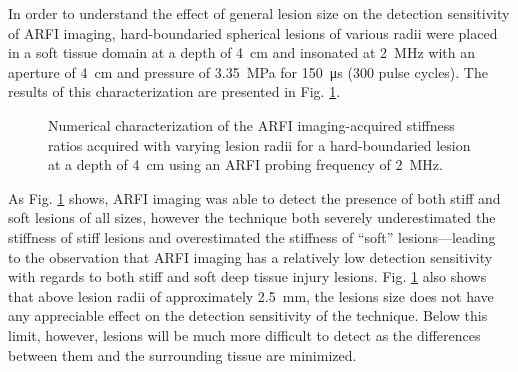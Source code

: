 			In order to understand the effect of general lesion size on the detection sensitivity of ARFI imaging, hard-boundaried spherical lesions of various radii were placed in a soft tissue domain at a depth of \SI{4}{\cm} and insonated at \SI{2}{\MHz} with an aperture of \SI{4}{\cm} and pressure of \SI{3.35}{\MPa} for \SI{150}{\us} (300 pulse cycles). The results of this characterization are presented in Fig. \ref{fig:arfi_radius}.

			\begin{figure}[!htb]
				\centering
				\caption[Numerical characterization of ARFI imaging-acquired stiffness ratio with changing lesion radius]{Numerical characterization of the ARFI imaging-acquired stiffness ratios acquired with varying lesion radii for a hard-boundaried lesion at a depth of \SI{4}{\cm} using an ARFI probing frequency of \SI{2}{\MHz}.}
				\label{fig:arfi_radius}
			\end{figure}

			As Fig. \ref{fig:arfi_radius} shows, ARFI imaging was able to detect the presence of both stiff and soft lesions of all sizes, however the technique both severely underestimated the stiffness of stiff lesions and overestimated the stiffness of ``soft'' lesions---leading to the observation that ARFI imaging has a relatively low detection sensitivity with regards to both stiff and soft deep tissue injury lesions. Fig. \ref{fig:arfi_radius} also shows that above lesion radii of approximately \SI{2.5}{\mm}, the lesions size does not have any appreciable effect on the detection sensitivity of the technique. Below this limit, however, lesions will be much more difficult to detect as the differences between them and the surrounding tissue are minimized.

